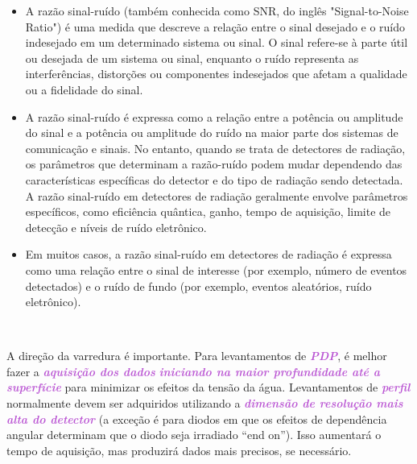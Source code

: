\documentclass[11pt,a4paper]{article}
\newcounter{exemplo}
\begin{document}
	\begin{tcolorbox}[width=\textwidth, colback={white}, colbacktitle={DarkTurquoise!50!white}, title={$\bigstar$ \LobsterTwo{Nota: Razão Sinal-Ruído} $\bigstar $}, coltitle={CarnationPink}, colframe={DarkTurquoise}, fonttitle=\rmfamily\bfseries\Large]

		\label{exp:razaoSinalRuido}
		\begin{itemize}[label=\textcolor{CarnationPink}{$\blacktriangleright$}]
			\item A razão sinal-ruído (também conhecida como SNR, do inglês "Signal-to-Noise Ratio") é uma medida que descreve a relação entre o sinal desejado e o ruído indesejado em um determinado sistema ou sinal. O sinal refere-se à parte útil ou desejada de um sistema ou sinal, enquanto o ruído representa as interferências, distorções ou componentes indesejados que afetam a qualidade ou a fidelidade do sinal.
			\item A razão sinal-ruído é expressa como a relação entre a potência ou amplitude do sinal e a potência ou amplitude do ruído na maior parte dos sistemas de comunicação e sinais. No entanto, quando se trata de detectores de radiação, os parâmetros que determinam a razão-ruído podem mudar dependendo das características específicas do detector e do tipo de radiação sendo detectada. A razão sinal-ruído em detectores de radiação geralmente envolve parâmetros específicos, como eficiência quântica, ganho, tempo de aquisição, limite de detecção e níveis de ruído eletrônico.
			\item Em muitos casos, a razão sinal-ruído em detectores de radiação é expressa como uma relação entre o sinal de interesse (por exemplo, número de eventos detectados) e o ruído de fundo (por exemplo, eventos aleatórios, ruído eletrônico).
		\end{itemize}
	\end{tcolorbox}

	\

	A direção da varredura é importante. Para levantamentos de \textcolor{MediumOrchid}{\textbf{\textit{PDP}}}, é melhor fazer a \textcolor{MediumOrchid}{\textbf{\textit{aquisição dos dados}}} \textcolor{MediumOrchid}{\textbf{\textit{iniciando na maior profundidade até a superfície}}} para minimizar os efeitos da tensão da água. Levantamentos de \textcolor{MediumOrchid}{\textbf{\textit{perfil}}} normalmente devem ser adquiridos utilizando a \textcolor{MediumOrchid}{\textbf{\textit{dimensão de resolução mais alta do detector}}} (a exceção é para diodos em que os efeitos de dependência angular determinam que o diodo seja irradiado “end on”). Isso aumentará o tempo de aquisição, mas produzirá dados mais precisos, se necessário.
\end{document}
